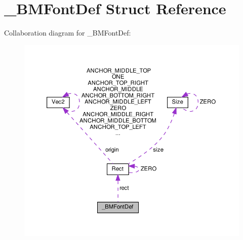\hypertarget{struct__BMFontDef}{}\section{\+\_\+\+B\+M\+Font\+Def Struct Reference}
\label{struct__BMFontDef}


Collaboration diagram for \+\_\+\+B\+M\+Font\+Def\+:
\nopagebreak
\begin{figure}[H]
\begin{center}
\leavevmode
\includegraphics[width=350pt]{struct__BMFontDef__coll__graph}
\end{center}
\end{figure}
